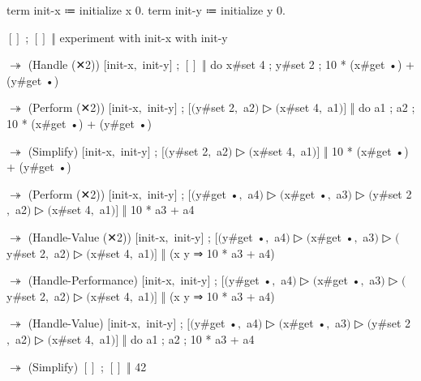 \begin{snippet}
term init-x ≔ initialize x 0.
term init-y ≔ initialize y 0.

$[]$ ; $[]$ ‖ experiment with init-x with init-y

$↠$ (Handle (✕2))
$[$init-x$,$ init-y$]$ ; $[]$
  ‖ do { x#set 4 ; y#set 2 ; 10 * (x#get •) + (y#get •) }

$↠$ (Perform (✕2))
$[$init-x$,$ init-y$]$ ; $[$$($y#set 2$,$ a2$)$ ▷ $($x#set 4$,$ a1$)$$]$
  ‖ do { a1 ; a2 ; 10 * (x#get •) + (y#get •) }

$↠$ (Simplify)
$[$init-x$,$ init-y$]$ ; $[$$($y#set 2$,$ a2$)$ ▷ $($x#set 4$,$ a1$)$$]$
  ‖ 10 * (x#get •) + (y#get •)

$↠$ (Perform (✕2))
$[$init-x$,$ init-y$]$ ;
$[$$($y#get •$,$ a4$)$ ▷ $($x#get •$,$ a3$)$ ▷ $($y#set 2$,$ a2$)$ ▷ $($x#set 4$,$ a1$)$$]$
  ‖ 10 * a3 + a4

$↠$ (Handle-Value (✕2))
$[$init-x$,$ init-y$]$ ;
$[$$($y#get •$,$ a4$)$ ▷ $($x#get •$,$ a3$)$ ▷ $($y#set 2$,$ a2$)$ ▷ $($x#set 4$,$ a1$)$$]$
  ‖ (x y ⇒ 10 * a3 + a4)

$↠$ (Handle-Performance)
$[$init-x$,$ init-y$]$ ;
$[$$($y#get •$,$ a4$)$ ▷ $($x#get •$,$ a3$)$ ▷ $($y#set 2$,$ a2$)$ ▷ $($x#set 4$,$ a1$)$$]$
  ‖ (x y ⇒ 10 * a3 + a4)

$↠$ (Handle-Value)
$[$init-x$,$ init-y$]$ ;
$[$$($y#get •$,$ a4$)$ ▷ $($x#get •$,$ a3$)$ ▷ $($y#set 2$,$ a2$)$ ▷ $($x#set 4$,$ a1$)$$]$
  ‖ do { a1 ; a2 ; 10 * a3 + a4 }

$↠$ (Simplify)
$[]$ ; $[]$ ‖ 42
\end{snippet}
